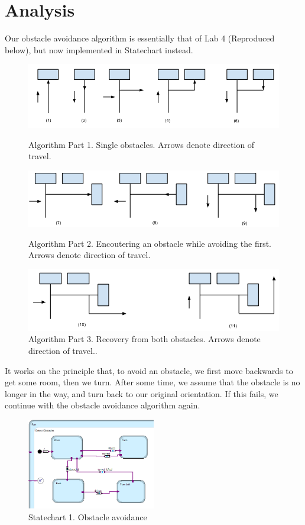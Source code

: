 \documentclass[10pt,titlepage]{article}
\begin{document}
  \section{Analysis}
    Our obstacle avoidance algorithm is essentially that of Lab 4 (Reproduced below), but now implemented in Statechart instead.
    \begin{figure}[H]
        \includegraphics[keepaspectratio, width=1\textwidth]{../lab6_data/a.png}
        \caption{Algorithm Part 1. Single obstacles. Arrows denote direction of travel.}
        \includegraphics[keepaspectratio, width=1\textwidth]{../lab6_data/b.png}
        \caption{Algorithm Part 2. Encoutering an obstacle while avoiding the first. Arrows denote direction of travel.}
        \includegraphics[keepaspectratio, width=1\textwidth]{../lab6_data/c.png}
        \caption{Algorithm Part 3. Recovery from both obstacles. Arrows denote direction of travel..}
    \end{figure}
    It works on the principle that, to avoid an obstacle, we first move backwards to get some room, then we turn. After some time, we assume that the obstacle is no longer in the way, and turn back to our original orientation. If this fails, we continue with the obstacle avoidance algorithm again. 
    \begin{figure}[H]
        \includegraphics[keepaspectratio, width=0.5\textwidth]{../lab6_data/6_1_SM.PNG}
        \caption{Statechart 1. Obstacle avoidance}
    \end{figure}
\end{document}
